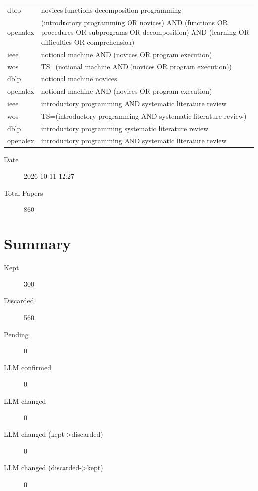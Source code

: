\documentclass{article}
\begin{document}
\begin{longtable}{lp{10cm}}
dblp & novices functions decomposition programming \\
openalex & (\textquotedbl{}introductory programming\textquotedbl{} OR novices) AND (functions OR procedures OR subprograms OR decomposition) AND (learning OR difficulties OR comprehension) \\
ieee & \textquotedbl{}notional machine\textquotedbl{} AND (novices OR \textquotedbl{}program execution\textquotedbl{}) \\
wos & TS=(\textquotedbl{}notional machine\textquotedbl{} AND (novices OR \textquotedbl{}program execution\textquotedbl{})) \\
dblp & notional machine novices \\
openalex & \textquotedbl{}notional machine\textquotedbl{} AND (novices OR \textquotedbl{}program execution\textquotedbl{}) \\
ieee & \textquotedbl{}introductory programming\textquotedbl{} AND \textquotedbl{}systematic literature review\textquotedbl{} \\
wos & TS=(\textquotedbl{}introductory programming\textquotedbl{} AND \textquotedbl{}systematic literature review\textquotedbl{}) \\
dblp & introductory programming systematic literature review \\
openalex & \textquotedbl{}introductory programming\textquotedbl{} AND \textquotedbl{}systematic literature review\textquotedbl{} \\
\bottomrule
\end{longtable}

\begin{description}
\item[Date] 2026-10-11 12:27
\item[Total Papers] 860
\end{description}

\section{Summary}
\begin{description}
\item[Kept] 300
\item[Discarded] 560
\item[Pending] 0
\item[LLM confirmed] 0
\item[LLM changed] 0
\item[LLM changed (kept->discarded)] 0
\item[LLM changed (discarded->kept)] 0
\end{description}
\end{document}
